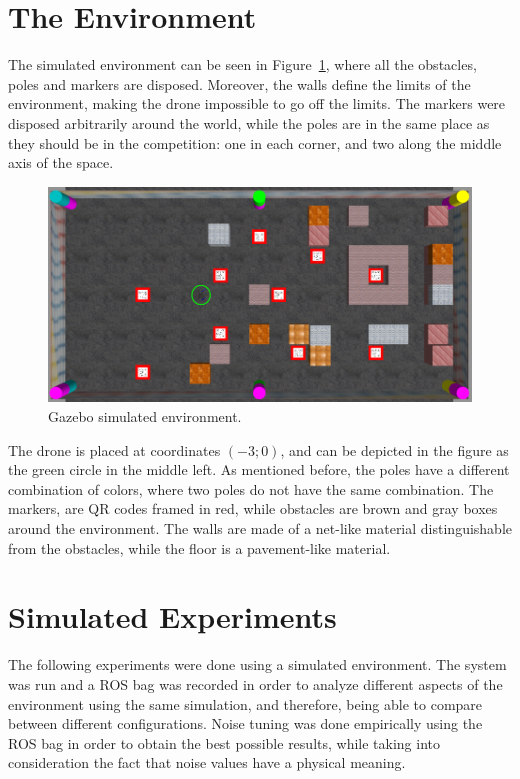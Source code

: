 \section{The Environment}
\label{sec:chapter3:environment}
The simulated environment can be seen in Figure~\ref{fig:chapter3:env:gazebo}, where all the obstacles, poles and markers are disposed. Moreover, the walls define the limits of the environment, making the drone impossible to go off the limits. The markers were disposed arbitrarily around the world, while the poles are in the same place as they should be in the competition: one in each corner, and two along the middle axis of the space.
\begin{figure}
\centering
\includegraphics[width=\textwidth]{Images/fig18-gazebo-environment}
\caption{Gazebo simulated environment.}
\label{fig:chapter3:env:gazebo}
\end{figure}
The drone is placed at coordinates $(-3;0)$, and can be depicted in the figure as the green circle in the middle left. As mentioned before, the poles have a different combination of colors, where two poles do not have the same combination. The markers, are QR codes framed in red, while obstacles are brown and gray boxes around the environment. The walls are made of a net-like material distinguishable from the obstacles, while the floor is a pavement-like material.

\section{Simulated Experiments}
\label{sec:chapter3:simulation}
The following experiments were done using a simulated environment. The system was run and a \ac{ROS} bag was recorded in order to analyze different aspects of the environment using the same simulation, and therefore, being able to compare between different configurations. Noise tuning was done empirically using the \ac{ROS} bag in order to obtain the best possible results, while taking into consideration the fact that noise values have a physical meaning.\\

